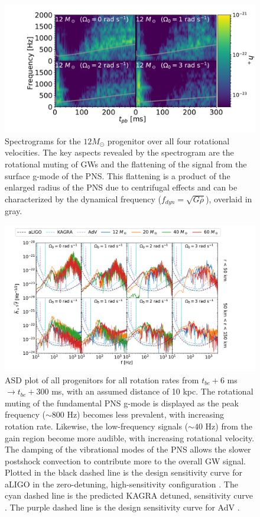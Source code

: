 \documentclass[twocolumn,times]{aastex62}  %
\begin{document}
\begin{figure}[t]
    \centering
    \includegraphics[trim=80 0 0 0, scale=0.38]{gws_2x2_line_test_size.pdf}
    \caption{Spectrograms for the $12 M_\odot$ progenitor over all four rotational velocities.  The key aspects revealed by the spectrogram are the rotational muting of GWs and the flattening of the signal from the surface g-mode of the PNS.  This flattening is a product of the enlarged radius of the PNS due to centrifugal effects and can be characterized by the dynamical frequency ($f_{dyn} = \sqrt{G \overline{\rho}}$), overlaid in gray.}
    \label{fig:2x2}
\end{figure}

\begin{figure}[t!]
  \centering     %
  \includegraphics[width=\textwidth]{tbe6tbe300_combined_M1_long_referee.pdf}
  \caption{ASD plot of all progenitors for all rotation rates from $t_{be}+6$ ms $\rightarrow t_{be}+300$ ms, with an assumed distance of 10 kpc.  The rotational muting of the fundamental PNS g-mode is displayed as the peak frequency ($\sim 800$ Hz) becomes less prevalent, with increasing rotation rate.  Likewise, the low-frequency signals ($\sim40$ Hz) from the gain region become more audible, with increasing rotational velocity.  The damping of the vibrational modes of the PNS allows the slower postshock convection to contribute more to the overall GW signal.  Plotted in the black dashed line is the design sensitivity curve for aLIGO in the zero-detuning, high-sensitivity configuration \citep{barsotti:2018}.  The cyan dashed line is the predicted KAGRA detuned, sensitivity curve \citep{komori:2017}.  The purple dashed line is the design sensitivity curve for AdV \citep{abbott:2018}.}
  \label{fig:spetra_long}
\end{figure}
\end{document}
